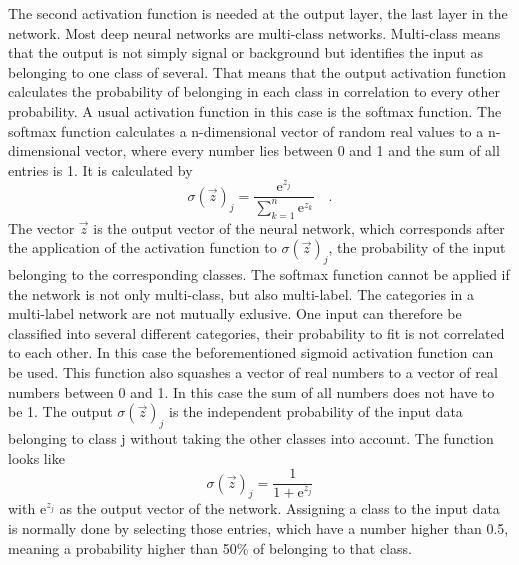 The second activation function is needed at the output layer, the last layer in the network. Most deep neural networks are multi-class networks. Multi-class means that the output is not simply signal or background but identifies the input as belonging to one class of several. That means that the output activation function calculates the probability of belonging in each class in correlation to every other probability. A usual activation function in this case is the softmax function. The softmax function calculates a n-dimensional vector of random real values to a n-dimensional vector, where every number lies between 0 and 1 and the sum of all entries is 1. It is calculated by
\begin{equation}
\sigma (\vec{z})_{j} = \frac{\mathrm{e}^{z_j}}{\sum_{k=1}^{n} \mathrm{e}^{z_k} } \quad .
\end{equation}
The vector $\vec{z}$ is the output vector of the neural network, which corresponds after the application of the activation function to $\sigma (\vec{z})_{j}$, the probability of the input belonging to the corresponding classes.
The softmax function cannot be applied if the network is not only multi-class, but also multi-label. The categories in a multi-label network are not mutually exlusive. One input can therefore be classified into several different categories, their probability to fit is not correlated to each other. In this case the beforementioned sigmoid activation function can be used. This function also squashes a vector of real numbers to a vector of real numbers between 0 and 1. In this case the sum of all numbers does not have to be 1. The output $\sigma (\vec{z})_{j}$ is the independent probability of the input data belonging to class j without taking the other classes into account. The function looks like
\begin{equation}
\sigma (\vec{z})_{j} = \frac{1}{1 + \mathrm{e}^{z_j}}  
\end{equation}
with $\mathrm{e}^{z_j}$ as the output vector of the network.
Assigning a class to the input data is normally done by selecting those entries, which have a number higher than 0.5, meaning a probability higher than 50\% of belonging to that class. 
